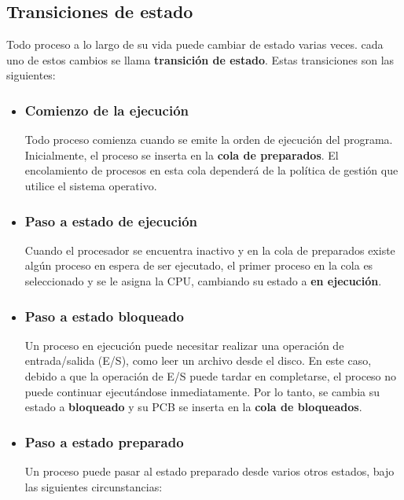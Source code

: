 \subsection{Transiciones de estado}
Todo proceso a lo largo de su vida puede cambiar de estado varias veces. cada uno de estos cambios se llama \textbf{transición de estado}. Estas transiciones son las siguientes:
\begin{tcolorbox}
	
	
	\begin{itemize}
		\item \subsubsection {Comienzo de la ejecución}
		Todo proceso comienza cuando se emite la orden de ejecución del programa. Inicialmente, el proceso se inserta en la \textbf{cola de preparados}. El encolamiento de procesos en esta cola dependerá de la política de gestión que utilice el sistema operativo.
		
		\item \subsubsection {Paso a estado de ejecución}
		Cuando el procesador se encuentra inactivo y en la cola de preparados existe algún proceso en espera de ser ejecutado, el primer proceso en la cola es seleccionado y se le asigna la CPU, cambiando su estado a \textbf{en ejecución}.
		
			\item \subsubsection {Paso a estado bloqueado}
		Un proceso en ejecución puede necesitar realizar una operación de entrada/salida (E/S), como leer un archivo desde el disco. En este caso, debido a que la operación de E/S puede tardar en completarse, el proceso no puede continuar ejecutándose inmediatamente. Por lo tanto, se cambia su estado a \textbf{bloqueado} y su PCB se inserta en la \textbf{cola de bloqueados}.
		
				\item \subsubsection{Paso a estado preparado}
		Un proceso puede pasar al estado preparado desde varios otros estados, bajo las siguientes circunstancias:
		

\end{itemize}
\end{tcolorbox}
